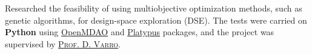 \documentclass[10pt,letter]{altacv}
\begin{document}
\divider

Researched the feasibility of using multiobjective optimization methods, such as genetic algorithms, for design-space exploration (DSE).
The tests were carried on \textbf{Python} using \href{http://openmdao.org/}{OpenMDAO} and \href{https://platypus.readthedocs.io/en/latest/}{Platypus} packages, and the project was supervised by \href{https://www.mcgill.ca/ece/daniel-varro}{\textsc{Prof. D. Varro}}.

\end{document}
